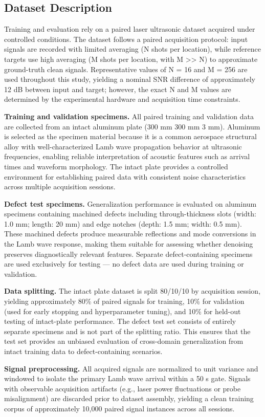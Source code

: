 \subsection{Dataset Description}
\label{sec:dataset}

Training and evaluation rely on a paired laser ultrasonic dataset acquired under controlled conditions. The dataset follows a paired acquisition protocol: input signals are recorded with limited averaging (N shots per location), while reference targets use high averaging (M shots per location, with M \textgreater{}\textgreater{} N) to approximate ground-truth clean signals. Representative values of N = 16 and M = 256 are used throughout this study, yielding a nominal SNR difference of approximately 12 dB between input and target; however, the exact N and M values are determined by the experimental hardware and acquisition time constraints.

\textbf{Training and validation specimens.} All paired training and validation data are collected from an intact aluminum plate (300 mm \times{} 300 mm \times{} 3 mm). Aluminum is selected as the specimen material because it is a common aerospace structural alloy with well-characterized Lamb wave propagation behavior at ultrasonic frequencies, enabling reliable interpretation of acoustic features such as arrival times and waveform morphology. The intact plate provides a controlled environment for establishing paired data with consistent noise characteristics across multiple acquisition sessions.

\textbf{Defect test specimens.} Generalization performance is evaluated on aluminum specimens containing machined defects including through-thickness slots (width: 1.0 mm; length: 20 mm) and edge notches (depth: 1.5 mm; width: 0.5 mm). These machined defects produce measurable reflections and mode conversions in the Lamb wave response, making them suitable for assessing whether denoising preserves diagnostically relevant features. Separate defect-containing specimens are used exclusively for testing --- no defect data are used during training or validation.

\textbf{Data splitting.} The intact plate dataset is split 80/10/10 by acquisition session, yielding approximately 80\% of paired signals for training, 10\% for validation (used for early stopping and hyperparameter tuning), and 10\% for held-out testing of intact-plate performance. The defect test set consists of entirely separate specimens and is not part of the splitting ratio. This ensures that the test set provides an unbiased evaluation of cross-domain generalization from intact training data to defect-containing scenarios.

\textbf{Signal preprocessing.} All acquired signals are normalized to unit variance and windowed to isolate the primary Lamb wave arrival within a 50 \textmu{}s gate. Signals with observable acquisition artifacts (e.g., laser power fluctuations or probe misalignment) are discarded prior to dataset assembly, yielding a clean training corpus of approximately 10,000 paired signal instances across all sessions.
